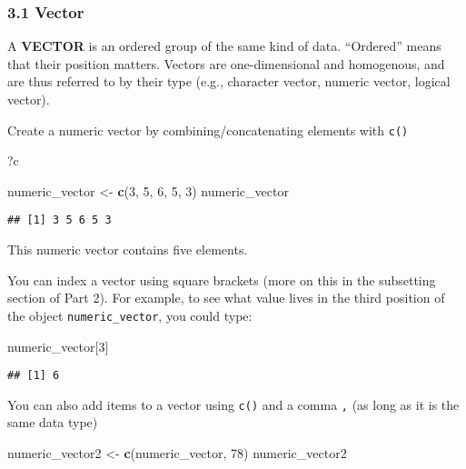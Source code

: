 \documentclass[]{article}
\newenvironment{Shaded}{\begin{snugshade}}{\end{snugshade}}
\newcommand{\KeywordTok}[1]{\textcolor[rgb]{0.13,0.29,0.53}{\textbf{#1}}}
\newcommand{\DecValTok}[1]{\textcolor[rgb]{0.00,0.00,0.81}{#1}}
\newcommand{\StringTok}[1]{\textcolor[rgb]{0.31,0.60,0.02}{#1}}
\newcommand{\NormalTok}[1]{#1}
\begin{document}
\subsubsection{3.1 Vector}\label{vector}

A \textbf{VECTOR} is an ordered group of the same kind of data.
``Ordered'' means that their position matters. Vectors are
one-dimensional and homogenous, and are thus referred to by their type
(e.g., character vector, numeric vector, logical vector).

Create a numeric vector by combining/concatenating elements with
\texttt{c()}

\begin{Shaded}
\begin{Highlighting}[]
\NormalTok{?c}
\end{Highlighting}
\end{Shaded}

\begin{Shaded}
\begin{Highlighting}[]
\NormalTok{numeric_vector <-}\StringTok{ }\KeywordTok{c}\NormalTok{(}\DecValTok{3}\NormalTok{, }\DecValTok{5}\NormalTok{, }\DecValTok{6}\NormalTok{, }\DecValTok{5}\NormalTok{, }\DecValTok{3}\NormalTok{)}
\NormalTok{numeric_vector}
\end{Highlighting}
\end{Shaded}

\begin{verbatim}
## [1] 3 5 6 5 3
\end{verbatim}

This numeric vector contains five elements.

You can index a vector using square brackets (more on this in the
subsetting section of Part 2). For example, to see what value lives in
the third position of the object \texttt{numeric\_vector}, you could
type:

\begin{Shaded}
\begin{Highlighting}[]
\NormalTok{numeric_vector[}\DecValTok{3}\NormalTok{]}
\end{Highlighting}
\end{Shaded}

\begin{verbatim}
## [1] 6
\end{verbatim}

You can also add items to a vector using \texttt{c()} and a comma
\texttt{,} (as long as it is the same data type)

\begin{Shaded}
\begin{Highlighting}[]
\NormalTok{numeric_vector2 <-}\StringTok{ }\KeywordTok{c}\NormalTok{(numeric_vector, }\DecValTok{78}\NormalTok{)}
\NormalTok{numeric_vector2}
\end{Highlighting}
\end{Shaded}
\end{document}
